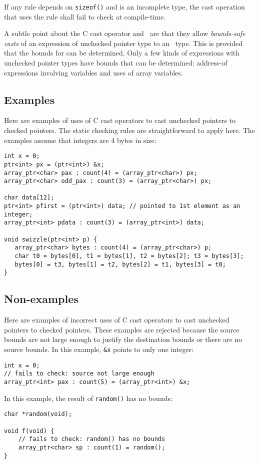 If any rule depends on \texttt{sizeof()} and  is
an incomplete type, the cast operation that uses the rule shall fail
to check at compile-time.

A subtle point about the C cast operator and \dynamicboundscast\
are that they allow {\em bounds-safe casts} of an expression
 of unchecked pointer type to an
\arrayptr\ type. This is provided that the bounds for 
can be determined. Only a few kinds of expressions with unchecked pointer
types have bounds that can be determined: address-of expressions
involving variables and uses of array variables.

\subsection{Examples}
\label{section:pointer-cast-examples}

Here are examples of uses of C cast operators to cast unchecked
pointers to checked pointers.  The static checking rules are straightforward
to apply here.  The examples assume that integers are
4 bytes in size:
\begin{lstlisting}
int x = 0;
ptr<int> px = (ptr<int>) &x;
array_ptr<char> pax : count(4) = (array_ptr<char>) px;
array_ptr<char> odd_pax : count(3) = (array_ptr<char>) px;

char data[12];
ptr<int> pfirst = (ptr<int>) data; // pointed to 1st element as an integer;
array_ptr<int> pdata : count(3) = (array_ptr<int>) data;

void swizzle(ptr<int> p) {
   array_ptr<char> bytes : count(4) = (array_ptr<char>) p;
   char t0 = bytes[0], t1 = bytes[1], t2 = bytes[2]; t3 = bytes[3];
   bytes[0] = t3, bytes[1] = t2, bytes[2] = t1, bytes[3] = t0;
}
\end{lstlisting}

\subsection{Non-examples}

Here are examples of incorrect uses of C cast operators to cast unchecked
pointers to checked pointers.  These examples are rejected because the
source bounds are not large enough to justify the destination bounds or
there are no source bounds.
In this example, \verb|&x| points to only one integer:
\begin{lstlisting}
int x = 0;
// fails to check: source not large enough
array_ptr<int> pax : count(5) = (array_ptr<int>) &x;
\end{lstlisting}
In this example, the result of \texttt{random()} has no bounds:
\begin{lstlisting}
char *random(void);

void f(void) {
    // fails to check: random() has no bounds
    array_ptr<char> sp : count(1) = random();
}
\end{lstlisting}

